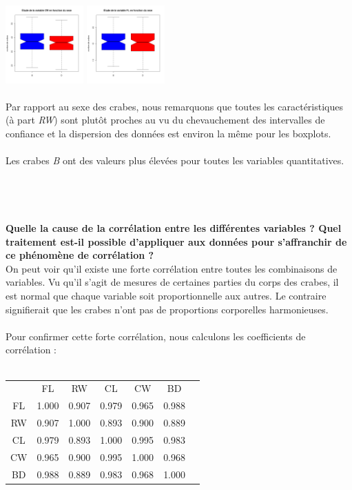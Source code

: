 \documentclass[a4paper, 10pt]{article}
\begin{document}
\includegraphics[height = 4cm, width = 3cm]{plots/boxplot_cw_sexe.png}
\includegraphics[height = 4cm, width = 3cm]{plots/boxplot_fl_sexe.png}\\
Par rapport au sexe des crabes, nous remarquons que toutes les caract\'eristiques (\`a part \textit{RW}) sont plut\^ot proches au vu
du chevauchement des intervalles de confiance et la dispersion des donn\'ees est environ la m\^eme pour les boxplots.\\ \\
Les crabes \textit{B} ont des valeurs plus \'elev\'ees pour toutes les variables quantitatives.\\ \\ \\ \\ \\
\textbf{Quelle la cause de la corr\'elation entre les diff\'erentes variables ?
Quel traitement est-il possible d'appliquer aux donn\'ees pour s'affranchir de ce ph\'enom\`ene de corr\'elation ?}\\
On peut voir qu'il existe une forte corr\'elation entre toutes les combinaisons de variables.
Vu qu'il s'agit de mesures de certaines parties du corps des crabes, il est normal que chaque variable soit proportionnelle aux autres.
Le contraire signifierait que les crabes n'ont pas de proportions corporelles harmonieuses.\\ \\
Pour confirmer cette forte corr\'elation, nous calculons les coefficients de corr\'elation :\\ \\
\begin{tabular}{|c|c|c|c|c|c|c|}
\hline
 & FL & RW & CL & CW & BD\\
FL & 1.000 & 0.907 & 0.979 & 0.965 & 0.988\\
\hline
RW & 0.907 & 1.000 & 0.893 & 0.900 & 0.889\\
\hline
CL & 0.979 & 0.893 & 1.000 & 0.995 & 0.983\\
\hline
CW & 0.965 & 0.900 & 0.995 & 1.000 & 0.968\\
\hline
BD & 0.988 & 0.889 & 0.983 & 0.968 & 1.000\\
\hline
\end{tabular}\\
\end{document}
